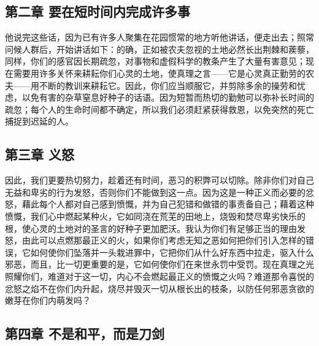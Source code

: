 
\subsection{第二章 要在短时间内完成许多事}

他说完这些话，因为已有许多人聚集在花园惯常的地方听他讲话，便走出去；照常问候人群后，开始讲话如下：的确，正如被农夫忽视的土地必然长出荆棘和蒺藜，同样，你们的感官因长期疏忽，对事物和虚假科学的教条产生了大量有害意见；现在需要用许多关怀来耕耘你们心灵的土地，使真理之言——它是心灵真正勤劳的农夫——用不断的教训来耕耘它。因此，你们应当顺服它，并剪除多余的操劳和忧虑，以免有害的杂草窒息好种子的话语。因为短暂而热切的勤勉可以弥补长时间的疏忽；每个人的生命时间都不确定，所以我们必须赶紧获得救恩，以免突然的死亡捕捉到迟延的人。\par


\subsection{第三章 义怒}

因此，我们更要热切努力，趁着还有时间，恶习的积弊可以切除。除非你们对自己无益和卑劣的行为发怒，否则你们不能做到这一点。因为这是一种正义而必要的忿怒，藉此每个人都对自己感到愤慨，并为自己犯错和做错的事责备自己；藉着这种愤慨，我们心中燃起某种火，它如同浇在荒芜的田地上，烧毁和焚尽卑劣快乐的根，使心灵的土地对的圣言的好种子更加肥沃。我认为你们有足够正当的理由发怒，由此可以点燃那最正义的火，如果你们考虑无知之恶如何把你们引入怎样的错误，它如何使你们坠落并一头栽进罪中，它把你们从什么好东西中拉走，驱入什么邪恶，而且，比一切更重要的是，它如何使你们在来世永罚中受罚。现在真理之光照耀你们，难道对于这一切，内心不会燃起最正义的愤慨之火吗？难道那令喜悦的忿怒之焰不在你们内升起，烧尽并毁灭一切从根长出的枝条，以防任何邪恶贪欲的嫩芽在你们内萌发吗？\par


\subsection{第四章 不是和平，而是刀剑}

